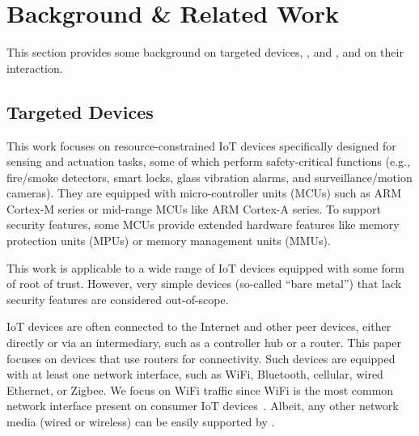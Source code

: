 \section{Background \& Related Work} \label{sec:background}
This section provides some background on targeted devices, \ra, and \ta, and on their interaction.
\subsection{Targeted Devices} \label{subsec:targeted_devices}
%
This work focuses on resource-constrained IoT devices specifically designed for sensing and actuation tasks, some of which perform safety-critical functions (e.g., fire/smoke detectors, smart locks, glass vibration alarms, and surveillance/motion cameras). They are equipped with micro-controller units (MCUs) such as ARM Cortex-M series or mid-range MCUs like ARM Cortex-A series. To support security features, some MCUs provide extended hardware features like memory protection units (MPUs) or memory management units (MMUs).

This work is applicable to a wide range of IoT devices equipped with some form of root of trust. However, very simple devices  (so-called ``bare metal'') that lack security features are considered out-of-scope.

IoT devices are often connected to the Internet and other peer devices, either directly or via an intermediary, 
such as a controller hub or a router. This paper focuses on devices that use routers for connectivity.
Such devices are equipped with at least one network interface, such as WiFi, Bluetooth, cellular, wired Ethernet, or Zigbee.
We focus on WiFi traffic since WiFi is the most common network interface present on consumer IoT devices~\cite{blevswifi}. 
Albeit, any other network media (wired or wireless) can be easily supported by \system.

